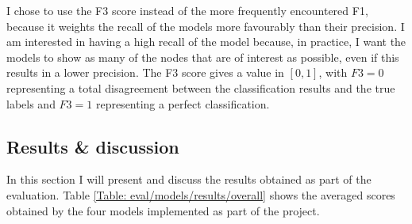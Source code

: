 		I chose to use the F3 score instead of the more frequently encountered F1, because it weights the recall of the models more favourably than their precision. I am interested in having a high recall of the model because, in practice, I want the models to show as many of the nodes that are of interest as possible, even if this results in a lower precision. The F3 score gives a value in $[0, 1]$, with $F3 = 0$ representing a total disagreement between the classification results and the true labels and $F3 = 1$ representing a perfect classification.
		
		\subsection{Results \& discussion} \label{Section: eval/ml/results}
		In this section I will present and discuss the results obtained as part of the evaluation. Table \ref{Table: eval/models/results/overall} shows the averaged scores obtained by the four models implemented as part of the project. 
		
